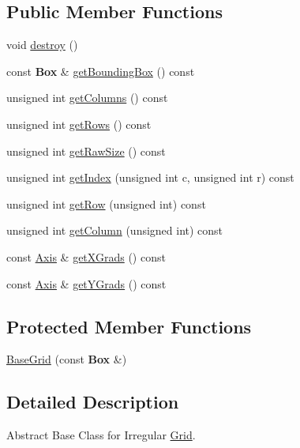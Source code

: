 \subsection*{Public Member Functions}
\begin{DoxyCompactItemize}
\item 
void \hyperlink{classKatabatic_1_1BaseGrid_a3a80b6032f86a56bec74609034b3246f}{destroy} ()
\item 
const {\bf Box} \& \hyperlink{classKatabatic_1_1BaseGrid_a895132a706d822c43d6ec747c3266f74}{get\-Bounding\-Box} () const 
\item 
unsigned int \hyperlink{classKatabatic_1_1BaseGrid_ae2bf24a99431664bb5897b122bb15b43}{get\-Columns} () const 
\item 
unsigned int \hyperlink{classKatabatic_1_1BaseGrid_ab7e3c454272e9a8f2c803e24454d7303}{get\-Rows} () const 
\item 
unsigned int \hyperlink{classKatabatic_1_1BaseGrid_ac25c519161036ae2d004fcc78abf7856}{get\-Raw\-Size} () const 
\item 
unsigned int \hyperlink{classKatabatic_1_1BaseGrid_a5ffadea177995aedb4152f58b9dd391d}{get\-Index} (unsigned int c, unsigned int r) const 
\item 
unsigned int \hyperlink{classKatabatic_1_1BaseGrid_a3a813e40c392fb62c5b1b86d11f1dcb4}{get\-Row} (unsigned int) const 
\item 
unsigned int \hyperlink{classKatabatic_1_1BaseGrid_a3ae31ad99809b916f386fe9bde67c6f2}{get\-Column} (unsigned int) const 
\item 
const \hyperlink{classKatabatic_1_1BaseGrid_1_1Axis}{Axis} \& \hyperlink{classKatabatic_1_1BaseGrid_a5731a526d261c2fa798a2c836cfeb9d1}{get\-X\-Grads} () const 
\item 
const \hyperlink{classKatabatic_1_1BaseGrid_1_1Axis}{Axis} \& \hyperlink{classKatabatic_1_1BaseGrid_a40fe4841176c132346564b3d4c942668}{get\-Y\-Grads} () const 
\end{DoxyCompactItemize}
\subsection*{Protected Member Functions}
\begin{DoxyCompactItemize}
\item 
\hyperlink{classKatabatic_1_1BaseGrid_ac479157e8ac115074615167e8a4a2789}{Base\-Grid} (const {\bf Box} \&)
\end{DoxyCompactItemize}


\subsection{Detailed Description}
Abstract Base Class for Irregular \hyperlink{classKatabatic_1_1Grid}{Grid}. 

